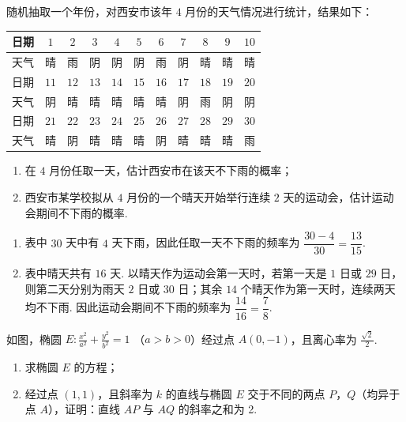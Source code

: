  \begin{problem}
随机抽取一个年份，对西安市该年 \(4\) 月份的天气情况进行统计，结果如下：

\begingroup
\setlength{\tabcolsep}{3pt}
\begin{center}
\begin{tabular}{|c|c|c|c|c|c|c|c|c|c|c|}
\hline
日期 & \(1\) & \(2\) & \(3\) & \(4\) & \(5\) & \(6\) & \(7\) & \(8\) & \(9\) & \(10\) \\
\hline
天气 & 晴 & 雨 & 阴 & 阴 & 阴 & 雨 & 阴 & 晴 & 晴 & 晴 \\
\hline
日期 & \(11\) & \(12\) & \(13\) & \(14\) & \(15\) & \(16\) & \(17\) & \(18\) & \(19\) & \(20\) \\
\hline
天气 & 阴 & 晴 & 晴 & 晴 & 晴 & 晴 & 阴 & 雨 & 阴 & 阴 \\
\hline
日期 & \(21\) & \(22\) & \(23\) & \(24\) & \(25\) & \(26\) & \(27\) & \(28\) & \(29\) & \(30\) \\
\hline
天气 & 晴 & 阴 & 晴 & 晴 & 晴 & 阴 & 晴 & 晴 & 晴 & 雨 \\
\hline
\end{tabular}
\end{center}
\endgroup

\begin{enumerate}
\item 在 \(4\) 月份任取一天，估计西安市在该天不下雨的概率；
\item 西安市某学校拟从 \(4\) 月份的一个晴天开始举行连续 \(2\) 天的运动会，估计运动会期间不下雨的概率.
 \end{enumerate}
 \end{problem}

\begin{solution}
\begin{enumerate}
\item 表中 \(30\) 天中有 \(4\) 天下雨，因此任取一天不下雨的频率为 \(\dfrac{30-4}{30}=\dfrac{13}{15}\).
\item 表中晴天共有 \(16\) 天. 以晴天作为运动会第一天时，若第一天是 \(1\) 日或 \(29\) 日，则第二天分别为雨天 \(2\) 日或 \(30\) 日；其余 \(14\) 个晴天作为第一天时，连续两天均不下雨. 因此运动会期间不下雨的频率为 \(\dfrac{14}{16}=\dfrac{7}{8}\).
\end{enumerate}
\end{solution}

 \begin{problem}
 如图，椭圆 \(E: \frac{x^2}{a^2} + \frac{y^2}{b^2} = 1\) （\(a > b > 0\)）经过点 \(A(0,-1)\)，且离心率为 \(\frac{\sqrt{2}}{2}\).

\begin{enumerate}
\item 求椭圆 \(E\) 的方程；
\item 经过点 \((1,1)\)，且斜率为 \(k\) 的直线与椭圆 \(E\) 交于不同的两点 \(P\)，\(Q\)（均异于点 \(A\)），证明：直线 \(AP\) 与 \(AQ\) 的斜率之和为 2.
\end{enumerate}

 \end{problem}


